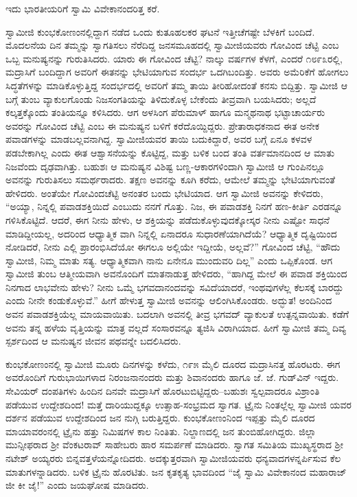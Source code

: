 ಇದು ಭಾರತೀಯರಿಗೆ ಸ್ವಾಮಿ ವಿವೇಕಾನಂದರಿತ್ತ ಕರೆ.

ಸ್ವಾಮೀಜಿ ಕುಂಭಕೋಣಂನಲ್ಲಿದ್ದಾಗ ನಡೆದ ಒಂದು ಕುತೂಹಲಕರ ಘಟನೆ ಇತ್ತೀಚೆಗಷ್ಟೇ ಬೆಳಕಿಗೆ ಬಂದಿದೆ. ಮೊದಲನೆಯ ದಿನ ತಮ್ಮನ್ನು ಸ್ವಾಗತಿಸಲು ನೆರೆದಿದ್ದ ಜನಸಮೂಹದಲ್ಲಿ ಸ್ವಾಮೀಜಿಯವರು ಗೋವಿಂದ ಚೆಟ್ಟಿ ಎಂಬ ಒಬ್ಬ ಮನುಷ್ಯನನ್ನು ಗುರುತಿಸಿದರು. ಯಾರು ಈ ಗೋವಿಂದ ಚೆಟ್ಟಿ? ನಾಲ್ಕು ವರ್ಷಗಳ ಕೆಳಗೆ, ಎಂದರೆ ೧೮೯೩ರಲ್ಲಿ, ಮದ್ರಾಸಿಗೆ ಬಂದಿದ್ದಾಗ ಅವರಿಗೆ ಈತನನ್ನು ಭೇಟಿಯಾಗುವ ಸಂದರ್ಭ ಒದಗಿಬಂದಿತ್ತು. ಅವರು ಅಮೆರಿಕೆಗೆ ಹೋಗಲು ಸಿದ್ಧತೆಗಳನ್ನು ಮಾಡಿಕೊಳ್ಳುತ್ತಿದ್ದ ಸಂದರ್ಭದಲ್ಲಿ ಅವರಿಗೆ ತಮ್ಮ ತಾಯಿ ತೀರಿಹೋದಂತೆ ಕನಸು ಬಿದ್ದಿತ್ತು. ಸ್ವಾಮೀಜಿ ಆ ಬಗ್ಗೆ ತುಂಬ ವ್ಯಾಕುಲಗೊಂಡು ನಿಜಸಂಗತಿಯನ್ನು ತಿಳಿದುಕೊಳ್ಳ ಬೇಕೆಂದು ತೀವ್ರವಾಗಿ ಬಯಸಿದರು; ಅಲ್ಲದೆ ಕಲ್ಕತ್ತಕ್ಕೊಂದು ತಂತಿಯನ್ನೂ ಕಳಿಸಿದರು. ಆಗ ಅಳಸಿಂಗ ಪೆರುಮಾಳ್ ಹಾಗೂ ಮನ್ಮಥನಾಥ ಭಟ್ಟಾಚಾರ್ಯರು ಅವರನ್ನು ಗೋವಿಂದ ಚೆಟ್ಟಿ ಎಂಬ ಈ ಮನುಷ್ಯನ ಬಳಿಗೆ ಕರೆದೊಯ್ದಿದ್ದರು. ಪ್ರೇತಾರಾಧಕನಾದ ಈತ ಅನೇಕ ಪವಾಡಗಳನ್ನು ಮಾಡಬಲ್ಲವನಾಗಿದ್ದ. ಸ್ವಾಮೀಜಿಯವರ ತಾಯಿ ಬದುಕಿದ್ದಾರೆ, ಅವರ ಬಗ್ಗೆ ಏನೂ ಕಳವಳ ಪಡಬೇಕಾಗಿಲ್ಲ ಎಂದು ಈತ ಆಶ್ವಾಸನೆಯನ್ನು ಕೊಟ್ಟಿದ್ದ, ಮತ್ತು ಬಳಿಕ ಬಂದ ತಂತಿ ವರ್ತಮಾನದಿಂದ ಆ ಮಾತು ನಿಜವೆಂದು ದೃಢವಾಗಿತ್ತು. ಬಹುಶಃ ಆ ಮನುಷ್ಯನ ವಿಶಿಷ್ಟ ಬಣ್ಣ-ಆಕಾರಗಳಿಂದಾಗಿ ಸ್ವಾಮೀಜಿ ಆ ಗುಂಪಿನಲ್ಲೂ ಅವನನ್ನು ಗುರುತಿಸಲು ಸಮರ್ಥರಾದರು. ತಕ್ಷಣ ಅವನನ್ನು ಕೂಗಿ ಕರೆದು, ಆಮೇಲೆ ತಮ್ಮನ್ನು ಭೇಟಿಯಾಗುವಂತೆ ಹೇಳಿದರು. ಅಂತೆಯೇ ಗೋವಿಂದಚೆಟ್ಟಿ ಅನಂತರ ಬಂದು ಭೇಟಿಯಾದ. ಆಗ ಸ್ವಾಮೀಜಿ ಅವನನ್ನು ಕೇಳಿದರು, “ಅಯ್ಯಾ, ನಿನ್ನಲ್ಲಿ ಪವಾಡಶಕ್ತಿಯಿದೆ ಎಂಬುದು ನನಗೆ ಗೊತ್ತು. ನಿಜ, ಈ ಪವಾಡಶಕ್ತಿ ನಿನಗೆ ಹಣ-ಕೀರ್ತಿ ಎರಡನ್ನೂ ಗಳಿಸಿಕೊಟ್ಟಿದೆ. ಆದರೆ, ಈಗ ನೀನು ಹೇಳು, ಆ ಶಕ್ತಿಯನ್ನು ಪಡೆದುಕೊಳ್ಳುವುದಕ್ಕೋಸ್ಕರ ನೀನು ಎಷ್ಟೋ ಸಾಧನೆ ಮಾಡಿದ್ದೀಯಲ್ಲ, ಅದರಿಂದ ಆಧ್ಯಾತ್ಮಿಕ ವಾಗಿ ನಿನ್ನಲ್ಲಿ ಏನಾದರೂ ಸುಧಾರಣೆಯಾಗಿದೆಯೆ? ಆಧ್ಯಾತ್ಮಿಕ ದೃಷ್ಟಿಯಿಂದ ನೋಡಿದರೆ, ನೀನು ಎಲ್ಲಿ ಪ್ರಾರಂಭಿಸಿದೆಯೋ ಈಗಲೂ ಅಲ್ಲಿಯೇ ಇದ್ದೀಯೆ, ಅಲ್ಲವೆ?” ಗೋವಿಂದ ಚೆಟ್ಟಿ, “ಹೌದು ಸ್ವಾಮೀಜಿ, ನಿಮ್ಮ ಮಾತು ಸತ್ಯ. ಆಧ್ಯಾತ್ಮಿಕವಾಗಿ ನಾನು ಏನೇನೂ ಮುಂದುವರಿ ದಿಲ್ಲ” ಎಂದು ಒಪ್ಪಿಕೊಂಡ. ಆಗ ಸ್ವಾಮೀಜಿ ತುಂಬ ಆತ್ಮೀಯವಾಗಿ ಅವನೊಂದಿಗೆ ಮಾತನಾಡುತ್ತ ಹೇಳಿದರು, “ಹಾಗಿದ್ದ ಮೇಲೆ ಈ ಪವಾಡ ಶಕ್ತಿಯಿಂದ ನಿನಗಾದ ಲಾಭವೇನು ಹೇಳು? ನೀನು ಒಮ್ಮೆ ಭಗವದಾನಂದವನ್ನು ಸವಿದೆಯಾದರೆ, ಇಂಥವುಗಳೆಲ್ಲ ಕೆಲಸಕ್ಕೆ ಬಾರದ್ದು ಎಂದು ನೀನೇ ಕಂಡುಕೊಳ್ಳುವೆ.” ಹೀಗೆ ಹೇಳುತ್ತ ಸ್ವಾಮೀಜಿ ಅವನನ್ನು ಆಲಿಂಗಿಸಿಕೊಂಡರು. ಅದ್ಭುತ! ಅಂದಿನಿಂದ ಅವನ ಪವಾಡಶಕ್ತಿಯೆಲ್ಲ ಮಾಯವಾಯಿತು. ಬದಲಾಗಿ ಅವನಲ್ಲಿ ತೀವ್ರ ಭಗವದ್ ವ್ಯಾಕುಲತೆ ಉತ್ಪನ್ನವಾಯಿತು. ಕಡೆಗೆ ಅವನು ತನ್ನ ಹಳೆಯ ವೃತ್ತಿಯನ್ನು ಮಾತ್ರ ವಲ್ಲದೆ ಸಂಸಾರವನ್ನೂ ತ್ಯಜಿಸಿ ವಿರಾಗಿಯಾದ. ಹೀಗೆ ಸ್ವಾಮೀಜಿ ತಮ್ಮ ದಿವ್ಯ ಸ್ಪರ್ಶದಿಂದ ಆ ಮನುಷ್ಯನ ಜೀವನ ಪಥವನ್ನೇ ಬದಲಿಸಿದರು.

ಕುಂಭಕೋಣಂನಲ್ಲಿ ಸ್ವಾಮೀಜಿ ಮೂರು ದಿನಗಳನ್ನು ಕಳೆದು, ೧೯೫ ಮೈಲಿ ದೂರದ ಮದ್ರಾಸಿನತ್ತ ಹೊರಟರು. ಈಗ ಅವರೊಂದಿಗೆ ಗುರುಭಾಯಿಗಳಾದ ನಿರಂಜನಾನಂದರು ಮತ್ತು ಶಿವಾನಂದರು ಹಾಗೂ ಜೆ. ಜೆ. ಗುಡ್​ವಿನ್ ಇದ್ದರು. ಸೇವಿಯರ್ ದಂಪತಿಗಳು ಹಿಂದಿನ ದಿನವೇ ಮದ್ರಾಸಿಗೆ ಹೊರಟುಬಿಟ್ಟಿದ್ದರು–ಬಹುಶಃ ಸ್ವಲ್ಪವಾದರೂ ವಿಶ್ರಾಂತಿ ಪಡೆಯುವ ಉದ್ದೇಶದಿಂದ! ಮತ್ತೆ ದಾರಿಯುದ್ದಕ್ಕೂ ಉತ್ಸಾಹ-ಸಂಭ್ರಮದ ಸ್ವಾಗತ. ಟ್ರೈನು ನಿಂತಲ್ಲೆಲ್ಲ ಸ್ವಾಮೀಜಿ ಯವರ ದರ್ಶನ ಪಡೆಯುವ ಉದ್ದೇಶದಿಂದ ಜನ ನುಗ್ಗಿ ಬರುತ್ತಿದ್ದರು. ಕುಂಭಕೋಣಂನಿಂದ ಇಪ್ಪತ್ತು ಮೈಲಿ ದೂರದ ಮಾಯಾವರಂನಲ್ಲಿ ಟ್ರೈನು ಹತ್ತು ನಿಮಿಷಗಳ ಕಾಲ ನಿಂತಿತು. ನಿಲ್ದಾಣದಲ್ಲಿ ಜನ ತುಂಬಿಹೋಗಿದ್ದರು. ಜಿಲ್ಲಾ ಮುನ್ಸೀಫರಾದ ಶ್ರೀ ವೆಂಕಟರಾವ್ ಸಾಹೇಬರು ಹಾರ ಸಮರ್ಪಣೆ ಮಾಡಿದರು. ಸ್ವಾಗತ ಸಮಿತಿಯ ಮುಖ್ಯಸ್ಥರಾದ ಶ್ರೀ ನಟೇಶ್ ಅಯ್ಯರರು ಬಿನ್ನವತ್ತಳೆಯನ್ನೋದಿದರು. ಅದಕ್ಕುತ್ತರವಾಗಿ ಸ್ವಾಮೀಜಿಯವರು ಧನ್ಯವಾದಗಳನ್ನರ್ಪಿಸುವ ಕೆಲ ಮಾತುಗಳನ್ನಾಡಿದರು. ಬಳಿಕ ಟ್ರೈನು ಹೊರಟಿತು. ಜನ ಕೃತಕೃತ್ಯ ಭಾವದಿಂದ “ಜೈ ಸ್ವಾಮಿ ವಿವೇಕಾನಂದ ಮಹಾರಾಜ್ ಜೀ ಕೀ ಜೈ!” ಎಂದು ಜಯಘೋಷ ಮಾಡಿದರು.

